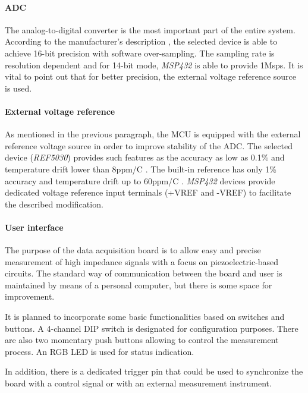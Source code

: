\documentclass[12pt,a4paper]{article}
\begin{document}
\par

\paragraph{ADC}
The analog-to-digital converter is the most important part of the entire system. According to the manufacturer's description \cite{msp432_params}, the selected device is able to achieve 16-bit precision with software over-sampling. The sampling rate is resolution dependent and for 14-bit mode, \textit{MSP432} is able to provide 1Msps. It is vital to point out that for better precision, the external voltage reference source is used. 
\par

\paragraph{External voltage reference}
As mentioned in the previous paragraph, the MCU is equipped with the external reference voltage source in order to improve stability of the ADC. The selected device (\textit{REF5030})  provides such features as the accuracy as low as 0.1\% and temperature drift lower than 8ppm/\degree C \cite{ref5030_params}. The built-in reference has only 1\% accuracy and temperature drift up to 60ppm/\degree C \cite{msp432_params}. \textit{MSP432} devices provide dedicated voltage reference input terminals (+VREF and -VREF) to facilitate the described modification.
\par

\paragraph{User interface} 
The purpose of the data acquisition board is to allow easy and precise measurement of high impedance signals with a focus on piezoelectric-based circuits. The standard way of communication between the board and user is maintained by means of a personal computer, but there is some space for improvement.
\par
It is planned to incorporate some basic functionalities based on switches and buttons. A 4-channel DIP switch is designated for configuration purposes. There are also two momentary push buttons allowing to control the measurement process. An RGB LED is used for status indication.
\par
In addition, there is a dedicated trigger pin that could be used to synchronize the board with a control signal or with an external measurement instrument.
\par
\end{document}
